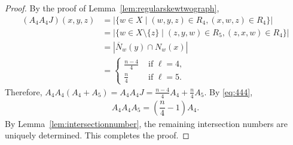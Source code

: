 \documentclass[11pt,oneside]{amsart}
\begin{document}
{\begin{proof}
    By the proof of Lemma~\ref{lem:regularskewtwograph}, 
    \begin{align*}
        (A_4A_4J)(x,y,z)&=|\{w\in X \mid (w,y,z)\in R_4,(x,w,z)\in R_4\}|\\
        &=|\{w\in X\setminus\{z\} \mid (z,y,w)\in R_5,(z,x,w)\in R_4\}|\\
        &=|\overline{N}_w(y)\cap N_w(x)|\\
        &=\begin{cases}
             \frac{n-4}{4} &\text{ if } \ell=4,\\
             \frac{n}{4} &\text{ if } \ell=5.
        \end{cases}
    \end{align*}
    Therefore, $A_4A_4(A_4+A_5)=A_4A_4J=\frac{n-4}{4}A_4+\frac{n}{4}A_5$.  
    By \eqref{eq:444}, 
    \begin{align}\label{eq:445}
    A_4A_4A_5=\left(\dfrac{n}{4}-1\right)A_4.
    \end{align}
    By Lemma~\ref{lem:intersectionnumber}, the remaining intersection numbers are uniquely determined. 
     This completes the proof.  
\end{proof}

}
\end{document}
